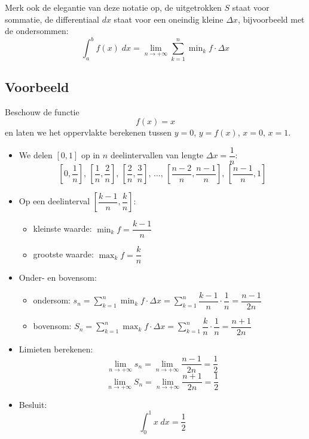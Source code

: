 \documentclass[a4paper,12pt, twoside]{article}
\begin{document}
Merk ook de elegantie van deze notatie op, de uitgetrokken $S$ staat voor sommatie, de differentiaal $dx$ staat voor een oneindig kleine $\Delta x$, bijvoorbeeld met de ondersommen:
$$\int_a^b f(x)\;dx = \lim_{n\to+\infty}\sum_{k=1}^n \min\nolimits_k f\cdot\Delta x$$

\pagebreak
\subsection{Voorbeeld}

Beschouw de functie
$$f(x)=x$$
en laten we het oppervlakte berekenen tussen $y=0$, $y=f(x)$, $x=0$, $x=1$.

\begin{center}
\end{center}

\begin{itemize}
  \item We delen $[0,1]$ op in $n$ deelintervallen van lengte $\Delta x=\dfrac{1}{n}$:
  $$[0,\dfrac{1}{n}],\, [\dfrac{1}{n},\dfrac{2}{n}],\, [\dfrac{2}{n},\dfrac{3}{n}],\, \ldots,\, [\dfrac{n-2}{n},\dfrac{n-1}{n}],\, [\dfrac{n-1}{n},1]$$
  \item Op een deelinterval $[\dfrac{k-1}{n},\dfrac{k}{n}]$:
  \begin{itemize}
    \item kleinste waarde: $\min_k f = \dfrac{k-1}{n}$
    \item grootste waarde: $\max_k f = \dfrac{k}{n}$
  \end{itemize}
  \item Onder- en bovensom:
  \begin{itemize}
    \item ondersom: $s_n=\sum^n_{k=1}\min_k f \cdot \Delta x=\sum^n_{k=1}\dfrac{k-1}{n}\cdot\dfrac{1}{n}=\dfrac{n-1}{2n}$
    \item bovensom: $S_n=\sum^n_{k=1}\max_k f \cdot \Delta x=\sum^n_{k=1}\dfrac{k}{n}\cdot\dfrac{1}{n}=\dfrac{n+1}{2n}$
  \end{itemize}
  \item Limieten berekenen:
  $$\lim_{n\to+\infty}s_n=\lim_{n\to+\infty}\dfrac{n-1}{2n}=\dfrac{1}{2}$$
  $$\lim_{n\to+\infty}S_n=\lim_{n\to+\infty}\dfrac{n+1}{2n}=\dfrac{1}{2}$$
  \item Besluit:
  $$\int_0^1 x\;dx=\dfrac{1}{2}$$
\end{itemize}
\end{document}
